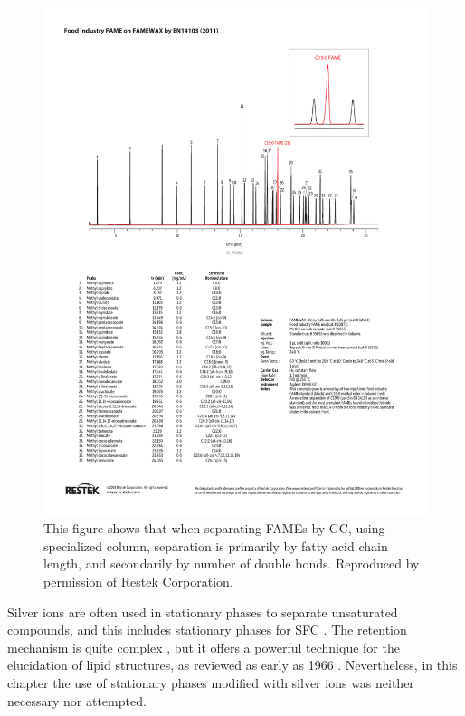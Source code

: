 \begin{figure}
\centering
\includegraphics[width=\textwidth]{Figures/GC_PC1332.pdf}
\decoRule

\caption[Separation of FAME by GC]{This figure shows that when separating FAMEs
by GC, using specialized column, separation is primarily by fatty acid chain
length, and secondarily by number of double bonds. Reproduced by permission of Restek Corporation.}

\label{fig:RestekFAMEsGC}
\end{figure}

Silver ions are often used in stationary phases to separate unsaturated
compounds, and this includes stationary phases for SFC \autocite{Sandra2002,
Potgieter2013}. The retention mechanism is quite complex
\autocite{Nikolova-Damyanova2019}, but it offers a powerful technique for the
elucidation of lipid structures, as reviewed as early as 1966
\autocite{Morris1966}. Nevertheless, in this chapter the use of stationary
phases modified with silver ions was neither necessary nor attempted.

